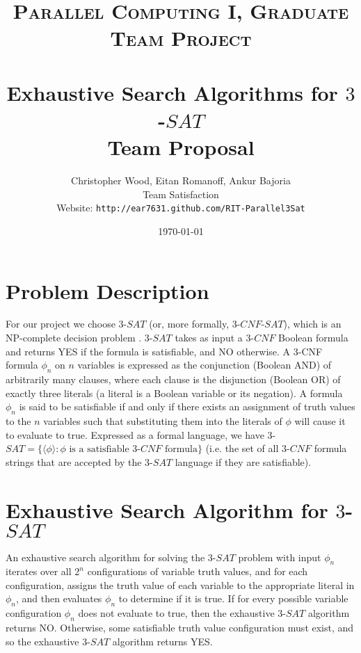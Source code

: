 \documentclass[paper=a4, fontsize=11pt]{scrartcl} %
\title{	
\normalfont \normalsize 
\textsc{Parallel Computing I, Graduate Team Project} \\ %
\horrule{2pt} \\[0.4cm] %
\vspace{-1.5em}
\huge Exhaustive Search Algorithms for $3$-$SAT$ \\ 
\Large Team Proposal \\
\vspace{-0.5em}
\horrule{2pt}
}
\author{Christopher Wood, Eitan Romanoff, Ankur Bajoria \\
Team Satisfaction\\
Website: {\tt http://ear7631.github.com/RIT-Parallel3Sat} } %
\date{\large \today} %
\begin{document}
\maketitle %

\vspace{-2em}
\section{Problem Description}
For our project we choose $3$-$SAT$ (or, more formally, $3$-$CNF$-$SAT$), which 
is an NP-complete decision problem \cite{algs}. $3$-$SAT$ takes as input 
a $3$-$CNF$ Boolean formula and returns YES if the formula is 
satisfiable, and NO otherwise. A 3-CNF formula $\phi_n$ on $n$ variables
is expressed as the conjunction (Boolean AND) of arbitrarily many clauses, 
where each clause is the disjunction (Boolean OR) of exactly three literals (a 
literal is a Boolean variable or its negation). A formula $\phi_n$ 
is said to be satisfiable if and only if there exists an 
assignment of truth values to the $n$ variables such that substituting them 
into the literals of $\phi$ will cause it to evaluate to true. 
Expressed as a formal language, we have 
$3$-$SAT = \{\langle \phi \rangle : \phi \text{ is a satisfiable }3\text{-}CNF\text{ formula} \}$
(i.e. the set of all $3$-$CNF$ formula strings that are accepted by the 
$3$-$SAT$ language if they are satisfiable).

\section{Exhaustive Search Algorithm for $3$-$SAT$}
An exhaustive search algorithm for solving the $3$-$SAT$ 
problem with input $\phi_n$ iterates over 
all $2^n$ configurations of variable truth values, and for each 
configuration, assigns the truth value of each variable 
to the appropriate literal in $\phi_n$, and then evaluates $\phi_n$ to determine if it is true. If for 
every possible variable configuration $\phi_n$ does not evaluate to 
true, then the exhaustive $3$-$SAT$ algorithm returns NO. Otherwise, 
some satisfiable truth value configuration must exist, and so the exhaustive $3$-$SAT$ algorithm 
returns YES. 
\end{document}

